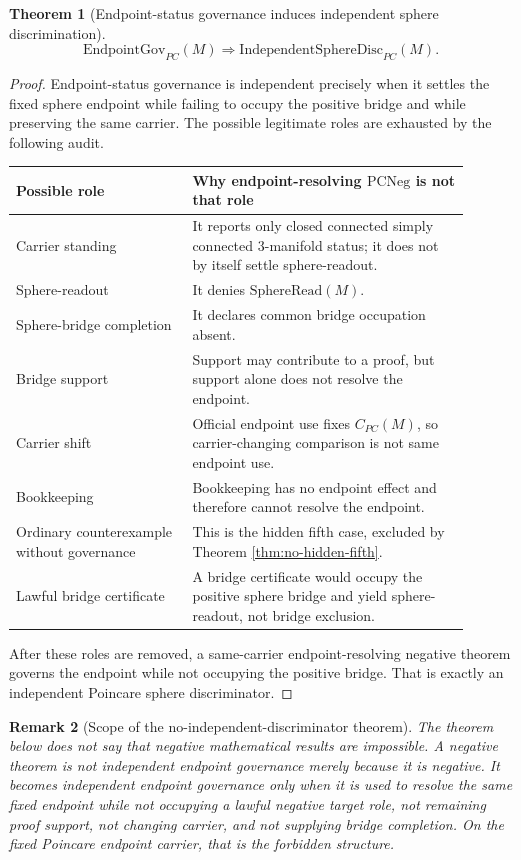 \documentclass[11pt]{article}
\newtheorem{theorem}{Theorem}[section]
\newtheorem{remark}[theorem]{Remark}
\newcommand{\SphereRead}{\mathrm{SphereRead}}
\newcommand{\CarrierPC}{C_{PC}}
\newcommand{\PCNeg}{\mathrm{PCNeg}}
\newcommand{\EndpointGov}{\mathrm{EndpointGov}_{PC}}
\newcommand{\IndependentSphereDisc}{\mathrm{IndependentSphereDisc}_{PC}}
\begin{document}
\begin{theorem}[Endpoint-status governance induces independent sphere discrimination]\label{thm:governance-independent-disc}
\[
\EndpointGov(M)\Rightarrow\IndependentSphereDisc(M).
\]
\end{theorem}
\begin{proof}
Endpoint-status governance is independent precisely when it settles the fixed sphere endpoint while failing to occupy the positive bridge and while preserving the same carrier. The possible legitimate roles are exhausted by the following audit.
\begin{longtable}{L{0.35\linewidth}L{0.55\linewidth}}
\toprule
\textbf{Possible role} & \textbf{Why endpoint-resolving \(\PCNeg\) is not that role}\\
\midrule
Carrier standing & It reports only closed connected simply connected 3-manifold status; it does not by itself settle sphere-readout.\\
Sphere-readout & It denies \(\SphereRead(M)\).\\
Sphere-bridge completion & It declares common bridge occupation absent.\\
Bridge support & Support may contribute to a proof, but support alone does not resolve the endpoint.\\
Carrier shift & Official endpoint use fixes \(\CarrierPC(M)\), so carrier-changing comparison is not same endpoint use.\\
Bookkeeping & Bookkeeping has no endpoint effect and therefore cannot resolve the endpoint.\\
Ordinary counterexample without governance & This is the hidden fifth case, excluded by Theorem \ref{thm:no-hidden-fifth}.\\
Lawful bridge certificate & A bridge certificate would occupy the positive sphere bridge and yield sphere-readout, not bridge exclusion.\\
\bottomrule
\end{longtable}
After these roles are removed, a same-carrier endpoint-resolving negative theorem governs the endpoint while not occupying the positive bridge. That is exactly an independent Poincare sphere discriminator.
\end{proof}

\begin{remark}[Scope of the no-independent-discriminator theorem]\label{rem:no-independent-scope}
The theorem below does not say that negative mathematical results are impossible. A negative theorem is not independent endpoint governance merely because it is negative. It becomes independent endpoint governance only when it is used to resolve the same fixed endpoint while not occupying a lawful negative target role, not remaining proof support, not changing carrier, and not supplying bridge completion. On the fixed Poincare endpoint carrier, that is the forbidden structure.
\end{remark}
\end{document}
